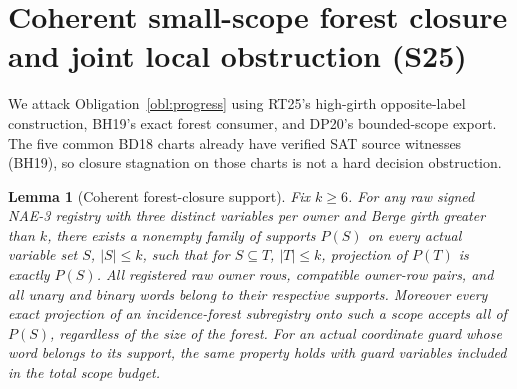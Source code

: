 \documentclass[11pt]{article}
\newtheorem{lemma}[theorem]{Lemma}
\begin{document}
\section{Coherent small-scope forest closure and joint local obstruction (S25)}\label{sec:s25}
We attack Obligation~\ref{obl:progress} using RT25's high-girth opposite-label construction, BH19's exact forest consumer, and DP20's bounded-scope export. The five common BD18 charts already have verified SAT source witnesses (BH19), so closure stagnation on those charts is not a hard decision obstruction.
\begin{lemma}[Coherent forest-closure support]\label{lem:s25-coherent}
Fix $k\ge6$. For any raw signed NAE-3 registry with three distinct variables per owner and Berge girth greater than $k$, there exists a nonempty family of supports $P(S)$ on every actual variable set $S$, $|S|\le k$, such that for $S\subseteq T$, $|T|\le k$, projection of $P(T)$ is exactly $P(S)$. All registered raw owner rows, compatible owner-row pairs, and all unary and binary words belong to their respective supports. Moreover every exact projection of an incidence-forest subregistry onto such a scope accepts all of $P(S)$, regardless of the size of the forest. For an actual coordinate guard whose word belongs to its support, the same property holds with guard variables included in the total scope budget.
\end{lemma}
\end{document}
